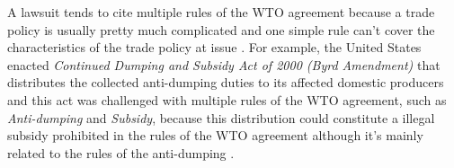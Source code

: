 A lawsuit tends to cite multiple rules of the WTO agreement because a trade policy is usually pretty much complicated
and one simple rule can't cover the characteristics of the trade policy at issue \citep{palmeter2004dispute}.
For example, the United States enacted \textit{Continued Dumping and Subsidy Act of 2000 (Byrd Amendment)} that distributes
the collected anti-dumping duties to its affected domestic producers and this act was challenged with multiple rules of the WTO agreement,
such as \textit{Anti-dumping} and \textit{Subsidy}, because
this distribution could constitute a illegal subsidy prohibited
in the rules of the WTO agreement although it's mainly related to the rules of the anti-dumping \citep{cdsoa}.
 

